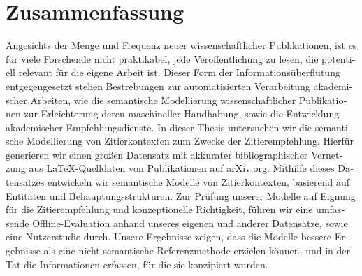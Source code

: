 \chapter*{Zusammenfassung}
\begin{otherlanguage}{ngerman}
Angesichts der Menge und Frequenz neuer wissenschaftlicher Publikationen, ist es für viele Forschende nicht praktikabel, jede Veröffentlichung zu lesen, die potentiell relevant für die eigene Arbeit ist. Dieser Form der Informationsüberflutung entgegengesetzt stehen Bestrebungen zur automatisierten Verarbeitung akademischer Arbeiten, wie die semantische Modellierung wissenschaftlicher Publikationen zur Erleichterung deren maschineller Handhabung, sowie die Entwicklung akademischer Empfehlungsdienste. In dieser Thesis untersuchen wir die semantische Modellierung von Zitierkontexten zum Zwecke der Zitierempfehlung. Hierfür generieren wir einen großen Datensatz mit akkurater bibliographischer Vernetzung aus \LaTeX{}-Quelldaten von Publikationen auf arXiv.org. Mithilfe dieses Datensatzes entwickeln wir semantische Modelle von Zitierkontexten, basierend auf Entitäten und Behauptungsstrukturen. Zur Prüfung unserer Modelle auf Eignung für die Zitierempfehlung und konzeptionelle Richtigkeit, führen wir eine umfassende Offline-Evaluation anhand unseres eigenen und anderer Datensätze, sowie eine Nutzerstudie durch. Unsere Ergebnisse zeigen, dass die Modelle bessere Ergebnisse als eine nicht-semantische Referenzmethode erzielen können, und in der Tat die Informationen erfassen, für die sie konzipiert wurden.
\end{otherlanguage}

